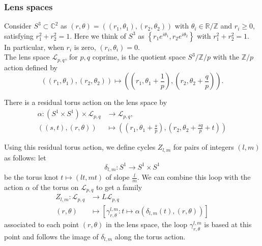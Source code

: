 \documentclass[reqno]{amsart}
\theoremstyle{definition}
\theoremstyle{remark}
\begin{document}
\subsubsection{Lens spaces}

Consider $S^3 \subset \mathbb{C}^2$ as
$\left( r, \theta \right) = 
\left( \left( r_1, \theta_1 \right) , 
\left( r_2, \theta_2 \right) \right) $ with
$\theta_i \in \mathbb{R} / \mathbb{Z}$ and
$r_i \ge 0$, satisfying $r_1^2 + r_2^2 = 1$. Here
we think of
$S^3$ as
$\left\{ r_1 e^{i \theta_1} , r_2 e^{i \theta_2} \right\} $ with
$r_1^2 + r_2^2 = 1$.\\
In particular, when $r_i$ is zero, 
$\left( r_i, \theta_i \right) = 0$.\\
The lens
space $\mathcal{L}_{p,q} $, for $p,q$ coprime, is
the quotient space
$S^3 / \mathbb{Z}/p$ with the $\mathbb{Z}/p$ action defined by
\[
    \left( (r_1, \theta_1), (r_2 , \theta_2) \right) 
    \mapsto 
    \left( \left( r_1, \theta_1 + \frac{1}{p} \right) ,
    \left( r_2, \theta_2 + \frac{q}{p} \right) \right) .
\] 

There is a residual torus action on the lens space by
\begin{align*}
    \alpha \colon \left( S^{1} \times S^{1} \right) \times 
    \mathcal{L}_{p,q} 
    &\to \mathcal{L}_{p,q},\\
    \left( (s,t), (r,\theta) \right) 
    &\mapsto \left( \left( r_1, \theta_1 + \frac{s}{p} \right) ,
    \left( r_2, \theta_2 + \frac{s q}{p}+t \right) \right) 
\end{align*}


Using this residual torus action, we define cycles 
$Z_{l,m}$ for pairs of integers $(l,m)$ as follows:
let
\[
\delta_{l,m} \colon S^{1} \to S^{1} \times S^{1}
\] 
be the torus knot $t \mapsto \left( lt, mt \right) $ of
slope $\frac{l}{m}$. We can combine this loop with the
action $\alpha$ of the torus on $\mathcal{L}_{p,q}$ to get
a family
\begin{align*}
    Z_{l,m} \colon \mathcal{L}_{p,q} 
    &\to L \mathcal{L}_{p,q}\\
    \left( r,\theta \right) 
    &\mapsto 
    \left[ \gamma_{r,\theta}^{l,m} \colon
    t \mapsto \alpha \left( \delta_{l,m}(t), (r,\theta) \right) \right] 
\end{align*}
associated to each point $(r, \theta)$ in the lens space,
the loop $\gamma_{r,\theta}^{l,m}$ is based at this point
and follows the image of $\delta_{l,m}$ along the torus action.
\end{document}
